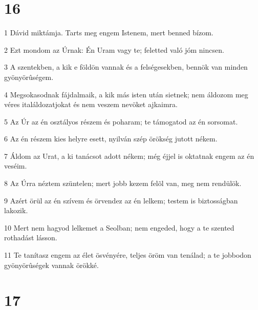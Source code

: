 \chapter{16}

\par 1 Dávid miktámja. Tarts meg engem Istenem, mert benned bízom.
\par 2 Ezt mondom az Úrnak: Én Uram vagy te; feletted való jóm nincsen.
\par 3 A szentekben, a kik e földön vannak és a felségesekben, bennök van minden gyönyörûségem.
\par 4 Megsokasodnak fájdalmaik, a kik más isten után sietnek; nem áldozom meg véres italáldozatjokat és nem veszem nevöket ajkaimra.
\par 5 Az Úr az én osztályos részem és poharam; te támogatod az én sorsomat.
\par 6 Az én részem kies helyre esett, nyilván szép örökség jutott nékem.
\par 7 Áldom az Urat, a ki tanácsot adott nékem; még éjjel is oktatnak engem az én veséim.
\par 8 Az Úrra néztem szüntelen; mert jobb kezem felõl van, meg nem rendülök.
\par 9 Azért örül az én szívem és örvendez az én lelkem; testem is biztosságban lakozik.
\par 10 Mert nem hagyod lelkemet a Seolban; nem engeded, hogy a te szented rothadást lásson.
\par 11 Te tanítasz engem az élet ösvényére, teljes öröm van tenálad; a te jobbodon gyönyörûségek vannak örökké.

\chapter{17}


